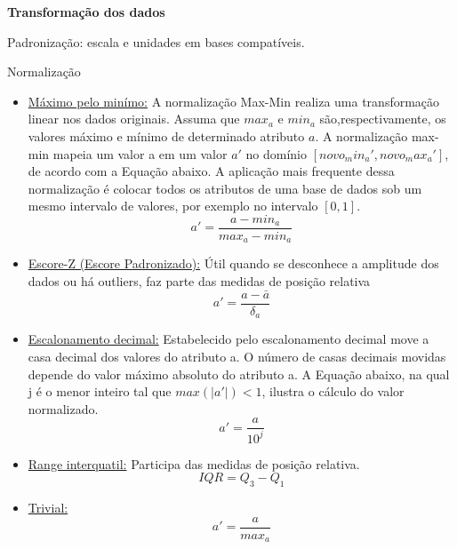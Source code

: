 \textbf{Transformação dos dados}

Padronização: escala e unidades em bases compatíveis.

Normalização

\begin{itemize}
	\item \underline{Máximo pelo minímo:}
		A normalização Max-Min realiza uma transformação linear nos dados originais. Assuma que $max_a$ e $min_a$ são,respectivamente, os valores máximo e mínimo de determinado atributo $a$.
		A normalização max-min mapeia um valor a em um valor $a'$ no domínio $[novo_min_a', novo_max_a']$, de acordo com a Equação abaixo.
		A aplicação mais frequente dessa normalização é colocar todos os atributos de uma base de dados sob um mesmo intervalo de valores, por exemplo no intervalo $[0, 1]$.
		\begin{equation} \label{eq:max_min}
			a' = \frac{a - min_a}{max_a - min_a}
		\end{equation}
	\item \underline{Escore-Z (Escore Padronizado):}
		Útil quando se desconhece a amplitude dos dados ou há outliers, faz parte das medidas de posição relativa
		\begin{equation} \label{eq:escore_z}
			a' = \frac{a - \bar{a}}{\delta_a}
		\end{equation}
	\item \underline{Escalonamento decimal:}
		Estabelecido pelo escalonamento decimal move a casa decimal dos valores do atributo a. O número de casas decimais movidas depende do valor máximo absoluto do atributo a.
		A Equação abaixo, na qual j é o menor inteiro tal que $max(|a'|) < 1$, ilustra o cálculo do valor normalizado.
		\begin{equation} \label{eq:decimal}
			a' = \frac{a}{10^j}
		\end{equation}
	\item \underline{Range interquatil:}
		Participa das medidas de posição relativa.
		\begin{equation} \label{eq:interquatil}
			IQR = Q_3 - Q_1
		\end{equation}
	\item \underline{Trivial:}
		\begin{equation} \label{eq:trivial}
			a' = \frac{a}{max_a}
		\end{equation}
\end{itemize}
